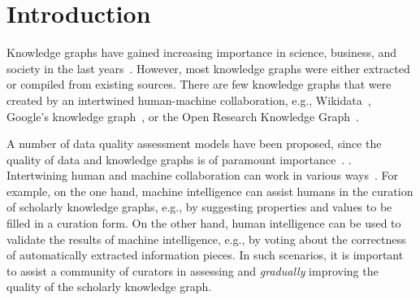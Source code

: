 \documentclass[runningheads]{llncs}
\begin{document}
\section{Introduction}

Knowledge graphs have gained increasing importance in science, business, and society in the last years~\cite{Stocker.2022}. However, most knowledge graphs were either extracted or compiled from existing sources. There are few knowledge graphs that were created by an intertwined human-machine collaboration, e.g., Wikidata~\cite{vrandevcic2014wikidata}, Google's knowledge graph~\cite{singhal2012introducing}, or the Open Research Knowledge Graph~\cite{jaradeh_open_2019}.

A number of data quality assessment models have been proposed, since the quality of data and knowledge graphs is of paramount importance~\cite{Bizer2009quality,zaveri2016quality,PipinoData}. .
Intertwining human and machine collaboration can work in various ways~\cite{oelen2021organizing}. For example, on the one hand, machine intelligence can assist humans in the curation of scholarly knowledge graphs, e.g., by suggesting properties and values to be filled in a curation form. On the other hand, human intelligence can be used to validate the results of machine intelligence, e.g., by voting about the correctness of automatically extracted information pieces. In such scenarios, it is important to assist a community of curators in assessing and \textit{gradually} improving the quality of the scholarly knowledge graph.
\end{document}
